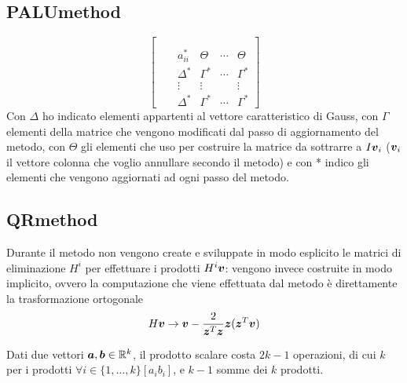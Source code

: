 \subsection{PALUmethod}
\label{subsection:PALUmethod}
\begin{oss}
\begin{displaymath}
\left [
\begin{array}{cccccc}
\\
\\
& & a_{ii}^{*} & \Theta & \cdots & \Theta   
	 \\ & & \Delta^{*} & \Gamma^{*} & \cdots & \Gamma^{*}
	 \\ & & \vdots & \vdots &  & \vdots
	 \\ & & \Delta^{*} & \Gamma^{*} & \cdots & \Gamma^{*}
\end{array}
\right ]
\end{displaymath}
Con $\Delta$ ho indicato elementi appartenti al vettore caratteristico di
Gauss, con $\Gamma$ elementi della matrice che vengono modificati dal
passo di aggiornamento del metodo, con $\Theta$ gli elementi che uso per
costruire la matrice da sottrarre a $I\boldsymbol{v}_{i}$ ($\boldsymbol{v}_{i}$ il vettore 
colonna che voglio annullare secondo il metodo) e con * indico gli elementi che
vengono aggiornati ad ogni passo del metodo.
\end{oss}


\subsection{QRmethod}
\label{subsection:QRmethod}
\begin{oss}
Durante il metodo non vengono create e sviluppate in modo esplicito le matrici
di eliminazione $H^{i}$ per effettuare i prodotti $H^{i}\boldsymbol{v}$: vengono
invece costruite in modo implicito, ovvero la computazione che viene effettuata
dal metodo \`e direttamente la trasformazione ortogonale 
\begin{displaymath}
H\boldsymbol{v} \rightarrow \boldsymbol{v} -
\frac{2}{\boldsymbol{z}^{T}\boldsymbol{z}}\boldsymbol{z}(\boldsymbol{z}^{T}\boldsymbol{v})
\end{displaymath}
\end{oss}

\begin{oss}
Dati due vettori $\boldsymbol{a}, \boldsymbol{b} \in \mathbb{R}^{k}$, il prodotto scalare
costa $2k - 1$ operazioni, di cui $k$ per i prodotti $\forall i \in
\{1, \ldots , k \} [a_{i}b_{i}]$, e $k-1$ somme dei $k$ prodotti.
\end{oss}

